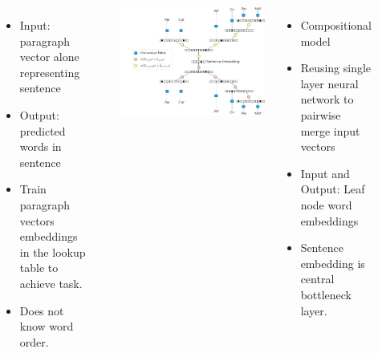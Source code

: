 \documentclass[a0paper, landscape]{tikzposter}
\begin{document}
\begin{columns}
{{\begin{minipage}[t]{0.48\linewidth}
\begin{tikzfigure}
				\end{tikzfigure}				
			\end{minipage}%
			\hfill
			\begin{adjustbox}{valign=t}
				\begin{minipage}[t]{0.48\linewidth}
					\begin{itemize}
						\item Input: paragraph vector alone representing sentence
						\item Output: predicted words in sentence
						\item Train paragraph vectors embeddings in the lookup table to achieve task.
						\item Does not know word order.
					\end{itemize}
					\small\cite{le2014distributed}
				\end{minipage}
			\end{adjustbox}
		}
		\vspace{2ex}
		{
			\begin{minipage}[t]{0.48\linewidth}
				\begin{tikzfigure}
					\includegraphics[width=\textwidth]{URAE}
				\end{tikzfigure}				
			\end{minipage}%
			\hfill
			\begin{adjustbox}{valign=t}
				\begin{minipage}[t]{0.48\linewidth}
					\begin{itemize}
						\item Compositional model
						\item Reusing single layer neural network to pairwise merge input vectors
						\item Input and Output: Leaf node word embeddings
						\item Sentence embedding is central bottleneck layer.
					\end{itemize}
					\small\cite{SocherEtAl2011:PoolRAE}
				\end{minipage}
			\end{adjustbox}
		}

}
\end{columns}
\end{document}

